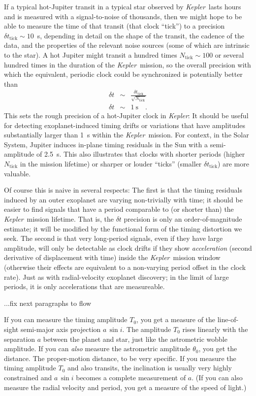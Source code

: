 \documentclass[12pt, preprint]{aastex}
\newcommand{\project}[1]{\textsl{#1}}
\newcommand{\Kepler}{\project{Kepler}}
\newcommand{\tick}{\mathrm{tick}}
\begin{document}
If a typical hot-Jupiter transit in a typical star observed by
\Kepler\ lasts hours and is measured with a signal-to-noise of
thousands, then we might hope to be able to measure the time of that
transit (that clock ``tick'') to a precision $\delta t_\tick\sim
10$~s, depending in detail on the shape of the transit, the cadence of
the data, and the properties of the relevant noise sources (some of
which are intrinsic to the star).
A hot Jupiter might transit a hundred times $N_\tick\sim 100$ or
several hundred times in the duration of the \Kepler\ mission, so the
overall precision with which the equivalent, periodic clock could be
synchronized is potentially better than
\begin{eqnarray}
\delta t &\sim& \frac{\delta t_\tick}{\sqrt{N_\tick}}
\\
\delta t &\sim& 1~\mathrm{s}
\quad .
\end{eqnarray}
This sets the rough precision of a hot-Jupiter clock in \Kepler:
It should be useful for detecting exoplanet-induced timing drifts or
variations that have amplitudes substantially larger than 1~s within
the \Kepler\ mission.
For context, in the Solar System, Jupiter induces in-plane timing
residuals in the Sun with a semi-amplitude of 2.5~s.
This also illustrates that clocks with shorter periods (higher
$N_\tick$ in the mission lifetime) or sharper or louder ``ticks''
(smaller $\delta t_\tick$) are more valuable.

Of course this is naive in several respects: The first is that the
timing residuals induced by an outer exoplanet are varying
non-trivially with time; it should be easier to find signals that have
a period comparable to (or shorter than) the \Kepler\ mission
lifetime.
That is, the $\delta t$ precision is only an order-of-magnitude
estimate; it will be modified by the functional form of the timing
distortion we seek.
The second is that very long-period signals, even if they have large
amplitude, will only be detectable as clock drifts if they show
\emph{acceleration} (second derivative of displacement with time)
inside the \Kepler\ mission window (otherwise their effects are
equivalent to a non-varying period offset in the clock rate).
Just as with radial-velocity exoplanet discovery; in the limit of
large periods, it is only accelerations that are measureable.

...fix next paragraphs to flow

If you can measure the timing amplitude $T_0$, you get a measure of
the line-of-sight semi-major axis projection $a\,\sin i$.
The amplitude $T_0$ rises linearly with the separation $a$ between the
planet and star, just like the astrometric wobble amplitude.
If you can \emph{also} measure the astrometric amplitude $\theta_0$,
you get the distance.
The proper-motion distance, to be very specific.
If you measure the timing amplitude $T_0$ and also transits, the
inclination is usually very highly constrained and $a\,\sin i$ becomes
a complete measurement of $a$.
(If you can also measure the radial velocity and period, you get a
measure of the speed of light.)
\end{document}
